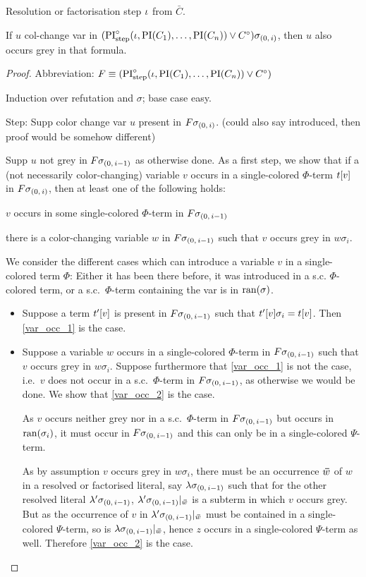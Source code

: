 \documentclass[,%
	draft=false,%
	numbers=noendperiod
	12pt,
	a4paper,
	oneside,%
	openany,
]{memoir}
\begin{document}
\begin{clemma}
	Resolution or factorisation step $\iota$ from $\bar C$.

	If $u$ col-change var in $(\operatorname{PI}^\circ_{\mathrm{step}}(\iota, \operatorname{PI}(C_1), \dots, \operatorname{PI}(C_n)) \lor C^\circ)\sigma_{(0,\,i)}$, then $u$ also occurs grey in that formula.
\end{clemma}
\begin{proof}
	Abbreviation: $F \equiv (\operatorname{PI}^\circ_{\mathrm{step}}(\iota, \operatorname{PI}(C_1), \dots, \operatorname{PI}(C_n)) \lor C^\circ)$

	Induction over refutation and $\sigma$; base case easy.

Step:
Supp color change var $u$ present in 
$F\sigma_{(0,\,i)}$. (could also say introduced, then proof would be somehow different)

Supp $u$ not grey in 
$F\sigma_{(0,\,i-1)}$ as otherwise done.
As a first step, we show that if a (not necessarily color-changing) variable $v$ occurs in a single-colored $\Phi$-term $t[v]$ in $F\sigma_{(0,\,i)}$,
then at least one of the following holds:
\begin{compactenum}
\item $v$ occurs in some single-colored $\Phi$-term in $F\sigma_{(0,\,i-1)}$ \label{var_occ_1}
\item there is a color-changing variable $w$ in $F\sigma_{(0,\,i-1)}$ such that $v$ occurs grey in $w\sigma_i$.  \label{var_occ_2}
\end{compactenum}
We consider the different cases which can introduce a variable $v$ in a single-colored term $\Phi$: Either it has been there before, it was introduced in a s.c. $\Phi$-colored term, or a s.c.\ $\Phi$-term containing the var is in $\operatorname{ran}(\sigma)$.
\begin{itemize}
	\item
		Suppose a term $t'[v]$ is present in $F\sigma_{(0,\,i-1)}$ such that $t'[v]\sigma_i = t[v]$.
		Then \ref{var_occ_1} is the case.
	\item
		Suppose a variable $w$ occurs in a single-colored $\Phi$-term in $F\sigma_{(0,\,i-1)}$ such that $v$ occurs grey in $w\sigma_i$.
		Suppose furthermore that \ref{var_occ_1} is not the case, i.e.\ $v$ does not occur in a s.c.\ $\Phi$-term in $F\sigma_{(0,\,i-1)}$, as otherwise we would be done.
		We show that \ref{var_occ_2} is the case.

		As $v$ occurs neither grey nor in a s.c.\ $\Phi$-term in $F\sigma_{(0,\,i-1)}$ but occurs in $\operatorname{ran}(\sigma_i)$, it must occur in $F\sigma_{(0,\,i-1)}$ and this can only be in a single-colored $\Psi$-term.

		As by assumption $v$ occurs grey in $w\sigma_i$, there must be an occurrence $\bm\bar w$ of $w$ in a resolved or factorised literal, say $\lambda\sigma_{(0,\,i-1)}$ such that for the other resolved literal $\lambda'\sigma_{(0,\,i-1)}$, $\lambda'\sigma_{(0,\,i-1)}|_{\bm\bar w}$ is a subterm in which $v$ occurs grey.
		But as the occurrence of $v$ in $\lambda'\sigma_{(0,\,i-1)}|_{\bm\bar w}$ must be contained in a single-colored $\Psi$-term, so is $\lambda\sigma_{(0,\,i-1)}|_{\bm\bar w}$, hence $z$ occurs in a single-colored $\Psi$-term as well.
		Therefore \ref{var_occ_2} is the case.


\end{itemize}
\end{proof}
\end{document}
